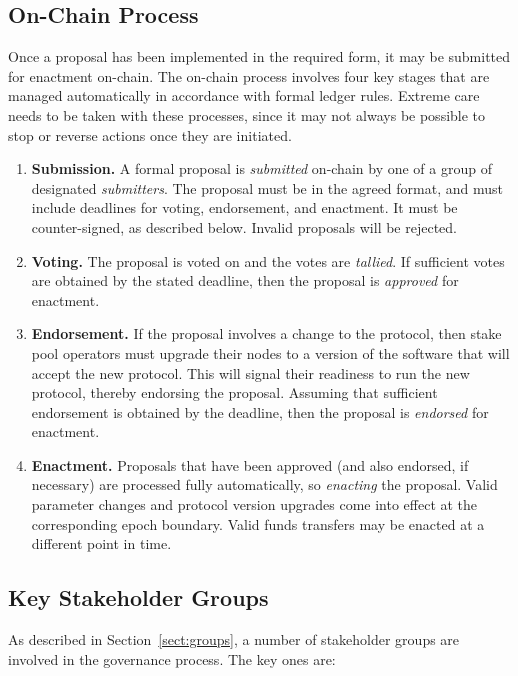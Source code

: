 \newpage
\subsection{On-Chain Process}

Once a proposal has been implemented in the required form, it may be submitted for enactment on-chain.  The on-chain process involves four key stages that are managed automatically in accordance with formal ledger rules.  Extreme care needs to be taken with these processes,
since it may not always be possible to stop or reverse actions once they are initiated.

\begin{enumerate}
\item
  \textbf{Submission.}  A formal proposal is \emph{submitted} on-chain by one of a group of designated \emph{submitters}.  The proposal must be in the agreed format, and must include deadlines for voting, endorsement, and enactment.  It must be counter-signed, as described below.  Invalid proposals will be rejected.
\item
  \textbf{Voting.}  The proposal is voted on and the votes are \emph{tallied}.  If sufficient votes are obtained by the stated deadline, then the proposal is \emph{approved} for enactment.
\item
  \textbf{Endorsement.}  If the proposal involves a change to the protocol, then stake pool operators must upgrade their nodes to a version of the software that will accept the new protocol.  This will signal their readiness to run the new protocol, thereby endorsing the proposal.
  Assuming that sufficient endorsement is obtained by the deadline, then the proposal is \emph{endorsed} for enactment.
\item
  \textbf{Enactment.}  Proposals that have been approved (and also endorsed, if necessary) are processed fully automatically, so \emph{enacting} the proposal.
  Valid parameter changes and protocol version upgrades come into effect at the corresponding epoch boundary.  Valid funds transfers may be enacted at a different
  point in time.
\end{enumerate}

\newpage
\subsection{Key Stakeholder Groups}

As described in Section~\ref{sect:groups}, a number of stakeholder groups are involved in the governance process.  The key ones are:

